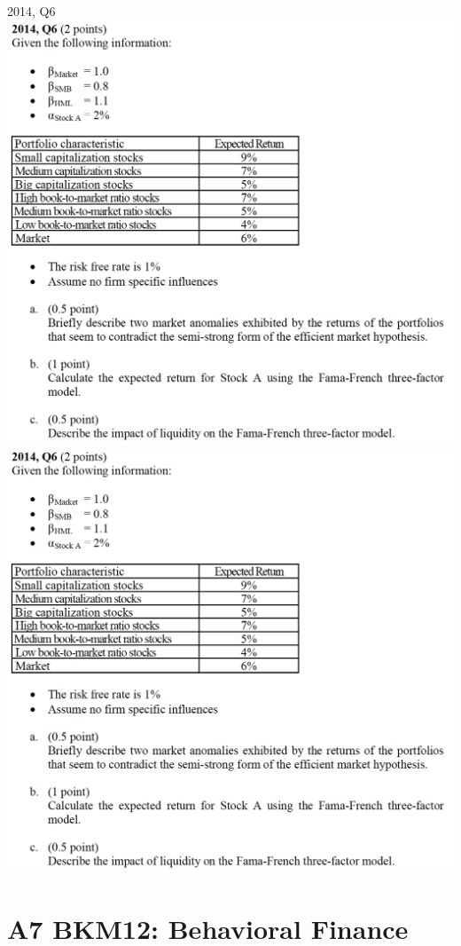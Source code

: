 \documentclass[]{book}
\theoremstyle{definition}
\theoremstyle{definition}
\theoremstyle{remark}
\begin{document}
 2014, Q6 \includegraphics{questions/2014-6Q.png}
\includegraphics{questions/2014-6Q.png}

\chapter{A7 BKM12: Behavioral
Finance}\label{a7-bkm12-behavioral-finance}
\end{document}
